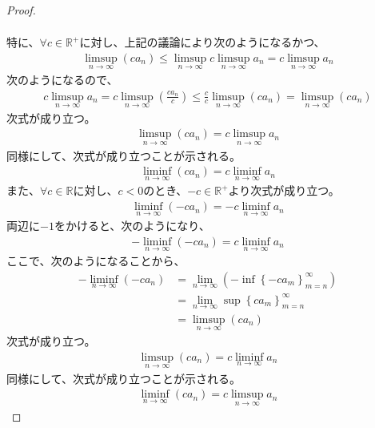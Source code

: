 \documentclass[dvipdfmx]{jsarticle}
\begin{document}
\begin{proof}
\begin{align*}
\end{align*}\par
特に、$\forall c \in \mathbb{R}^{+}$に対し、上記の議論により次のようになるかつ、
\begin{align*}
\limsup_{n \rightarrow \infty}\left( ca_{n} \right) \leq \limsup_{n \rightarrow \infty}c\limsup_{n \rightarrow \infty}a_{n} = c\limsup_{n \rightarrow \infty}a_{n}
\end{align*}
次のようになるので、
\begin{align*}
c\limsup_{n \rightarrow \infty}a_{n} = c\limsup_{n \rightarrow \infty}\left( \frac{ca_{n}}{c} \right) \leq \frac{c}{c}\limsup_{n \rightarrow \infty}\left( ca_{n} \right) = \limsup_{n \rightarrow \infty}\left( ca_{n} \right)
\end{align*}
次式が成り立つ。
\begin{align*}
\limsup_{n \rightarrow \infty}\left( ca_{n} \right) = c\limsup_{n \rightarrow \infty}a_{n}
\end{align*}
同様にして、次式が成り立つことが示される。
\begin{align*}
\liminf_{n \rightarrow \infty}\left( ca_{n} \right) = c\liminf_{n \rightarrow \infty}a_{n}
\end{align*}
また、$\forall c \in \mathbb{R}$に対し、$c < 0$のとき、$- c \in \mathbb{R}^{+}$より次式が成り立つ。
\begin{align*}
\liminf_{n \rightarrow \infty}\left( - ca_{n} \right) = - c\liminf_{n \rightarrow \infty}a_{n}
\end{align*}
両辺に$- 1$をかけると、次のようになり、
\begin{align*}
- \liminf_{n \rightarrow \infty}\left( - ca_{n} \right) = c\liminf_{n \rightarrow \infty}a_{n}
\end{align*}
ここで、次のようになることから、
\begin{align*}
- \liminf_{n \rightarrow \infty}\left( - ca_{n} \right) &= \lim_{n \rightarrow \infty}\left( - \inf\left\{ - ca_{m} \right\}_{m = n}^{\infty} \right)\\
&= \lim_{n \rightarrow \infty}{\sup\left\{ ca_{m} \right\}_{m = n}^{\infty}}\\
&= \limsup_{n \rightarrow \infty}\left( ca_{n} \right)
\end{align*}
次式が成り立つ。
\begin{align*}
\limsup_{n \rightarrow \infty}\left( ca_{n} \right) = c\liminf_{n \rightarrow \infty}a_{n}
\end{align*}
同様にして、次式が成り立つことが示される。
\begin{align*}
\liminf_{n \rightarrow \infty}\left( ca_{n} \right) = c\limsup_{n \rightarrow \infty}a_{n}
\end{align*}
\end{proof}
\end{document}
